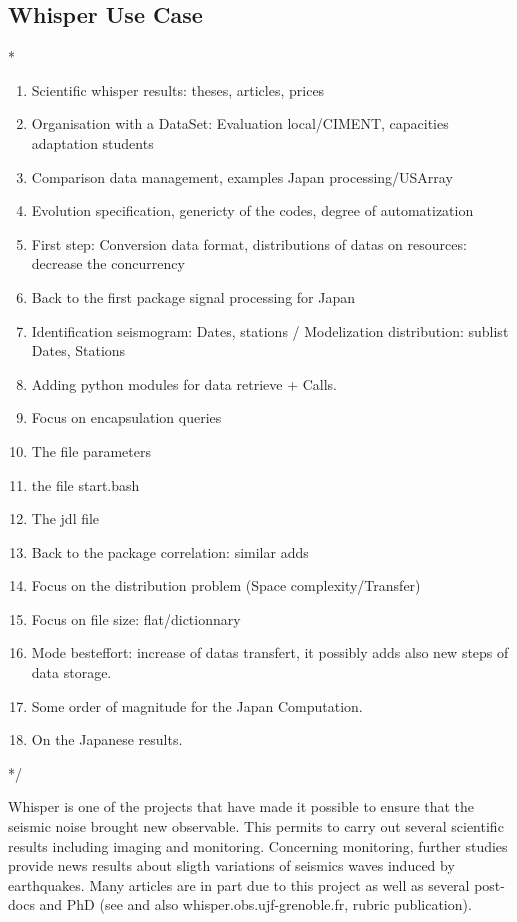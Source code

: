 \documentclass[a4paper, 10pt]{article}
\begin{document}
\begin{multicols}{2}
\subsection{Whisper Use Case}
\/*
	\begin{enumerate}
	  \item Scientific whisper results: theses, articles, prices
  	  \item Organisation with a DataSet: Evaluation local/CIMENT, capacities adaptation students
  	  \item Comparison data management, examples Japan processing/USArray 
  	  \item Evolution specification, genericty of the codes, degree of automatization
  	  \item First step: Conversion data format, distributions of datas on resources: decrease the concurrency
  	  \item Back to the first package signal processing for Japan
  	  \item Identification seismogram: Dates, stations  / Modelization distribution: sublist Dates, Stations
  	  \item Adding python modules for data retrieve + Calls.
  	  \item Focus on encapsulation queries
      \item The file parameters
      \item the file start.bash
      \item The jdl file
  	  \item Back to the package correlation: similar adds 
  	  \item Focus on the distribution problem (Space complexity/Transfer)
  	  \item Focus on file size: flat/dictionnary
  	  \item Mode besteffort: increase of datas transfert, it possibly adds also new steps of data storage.
  	  \item Some order of magnitude for the Japan Computation.
  	  \item On the Japanese results.
  	\end{enumerate}
*/

Whisper is one of the projects that have made it possible to ensure that the seismic noise brought new observable.
This permits to carry out several scientific results including imaging and monitoring. 
Concerning monitoring, further studies provide news results about sligth variations of seismics waves induced by earthquakes.
Many articles are in part due to this project as well as
several post-docs and PhD (see \cite{key:CFLC2010, key:BPCPBR, key:HCM2014, key:OPLC2013, key:PCP, key:MPPVCS, key:RCRZCSKCCWD, key:RBCSP, key:BCTASBEM} and also whisper.obs.ujf-grenoble.fr, rubric publication).



\end{multicols}
\end{document}
